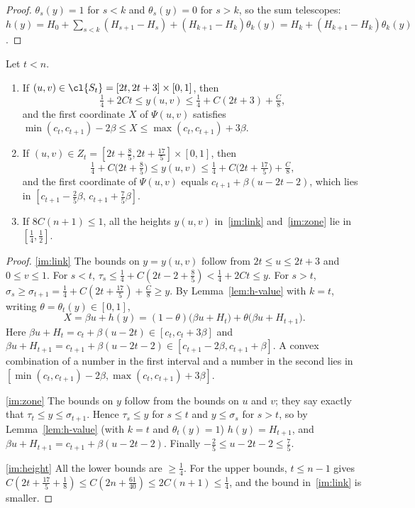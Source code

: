 \begin{proof}
$\theta_s(y)=1$ for $s<k$ and $\theta_s(y)=0$ for $s>k$, so the sum telescopes:
$h(y)=H_0+\sum_{s<k}(H_{s+1}-H_s)+(H_{k+1}-H_k)\theta_k(y)=H_k+(H_{k+1}-H_k)\theta_k(y)$.
\end{proof}


\begin{lemma}\label{lem:images}
Let $t<n$.
\begin{enumerate}[label=(\alph*)]
\item\label{im:link} If $(u,v)\in\cl{S_t}=[2t,2t+3]\times[0,1]$, then
\[
\tfrac14+2Ct\le y(u,v)\le\tfrac14+C(2t+3)+\tfrac C8,
\]
and the first coordinate $X$ of $\Psi(u,v)$ satisfies
$\min(c_t,c_{t+1})-2\beta\le X\le\max(c_t,c_{t+1})+3\beta$.
\item\label{im:zone} If $(u,v)\in Z_t=[2t+\frac85,2t+\frac{17}5]\times[0,1]$, then
\[
\tfrac14+C\big(2t+\tfrac85\big)\le y(u,v)\le\tfrac14+C\big(2t+\tfrac{17}5\big)+\tfrac C8,
\]
and the first coordinate of $\Psi(u,v)$ equals $c_{t+1}+\beta(u-2t-2)$, which lies in
$[c_{t+1}-\frac25\beta,\,c_{t+1}+\frac75\beta]$.
\item\label{im:height} If $8C(n+1)\le1$, all the heights $y(u,v)$ in~\ref{im:link}
and~\ref{im:zone} lie in $[\frac14,\frac12]$.
\end{enumerate}
\end{lemma}

\begin{proof}
\ref{im:link} The bounds on $y=y(u,v)$ follow from $2t\le u\le2t+3$ and $0\le v\le1$. For $s<t$,
$\tau_s\le\frac14+C(2t-2+\frac85)<\frac14+2Ct\le y$. For $s>t$, $\sigma_s\ge\sigma_{t+1}=\frac14+
C(2t+\frac{17}5)+\frac C8\ge y$. By Lemma~\ref{lem:h-value} with $k=t$, writing $\theta=\theta_t(y)\in
[0,1]$,
\[
X=\beta u+h(y)=(1-\theta)\big(\beta u+H_t\big)+\theta\big(\beta u+H_{t+1}\big).
\]
Here $\beta u+H_t=c_t+\beta(u-2t)\in[c_t,c_t+3\beta]$ and $\beta u+H_{t+1}=c_{t+1}+\beta(u-2t-2)\in
[c_{t+1}-2\beta,c_{t+1}+\beta]$. A convex combination of a number in the first interval and a
number in the second lies in $[\min(c_t,c_{t+1})-2\beta,\max(c_t,c_{t+1})+3\beta]$.

\ref{im:zone} The bounds on $y$ follow from the bounds on $u$ and $v$; they say exactly that
$\tau_t\le y\le\sigma_{t+1}$. Hence $\tau_s\le y$ for $s\le t$ and $y\le\sigma_s$ for $s>t$, so by
Lemma~\ref{lem:h-value} (with $k=t$ and $\theta_t(y)=1$) $h(y)=H_{t+1}$, and
$\beta u+H_{t+1}=c_{t+1}+\beta(u-2t-2)$. Finally $-\frac25\le u-2t-2\le\frac75$.

\ref{im:height} All the lower bounds are $\ge\frac14$. For the upper bounds, $t\le n-1$ gives
$C(2t+\frac{17}5+\frac18)\le C(2n+\frac{61}{40})\le2C(n+1)\le\frac14$, and the bound
in~\ref{im:link} is smaller.
\end{proof}

